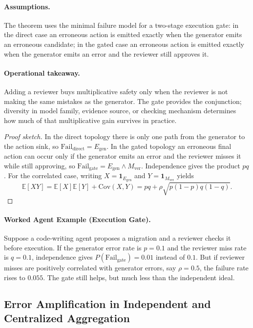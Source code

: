 \paragraph{Assumptions.}
The theorem uses the minimal failure model for a two-stage execution gate: in the direct case an
erroneous action is emitted exactly when the generator emits an erroneous candidate; in the gated case an
erroneous action is emitted exactly when the generator emits an error and the reviewer still approves it.

\paragraph{Operational takeaway.}
Adding a reviewer buys multiplicative safety only when the reviewer is not making the same mistakes as
the generator. The gate provides the conjunction; diversity in model family, evidence source, or checking
mechanism determines how much of that multiplicative gain survives in practice.

\begin{proof}[Proof sketch]
In the direct topology there is only one path from the generator to the action sink, so
$\mathrm{Fail}_{\mathrm{direct}} = E_{\mathrm{gen}}$. In the gated topology an erroneous final action can
occur only if the generator emits an error and the reviewer misses it while still approving, so
$\mathrm{Fail}_{\mathrm{gate}} = E_{\mathrm{gen}} \wedge M_{\mathrm{ver}}$. Independence gives the product
$pq$. For the correlated case, writing $X = \mathbf{1}_{E_{\mathrm{gen}}}$ and
$Y = \mathbf{1}_{M_{\mathrm{ver}}}$ yields
\[
\mathbb{E}[XY] = \mathbb{E}[X]\mathbb{E}[Y] + \mathrm{Cov}(X,Y)
= pq + \rho\sqrt{p(1-p)q(1-q)}.
\]
\end{proof}

\paragraph{Worked Agent Example (Execution Gate).}
Suppose a code-writing agent proposes a migration and a reviewer checks it before execution. If the
generator error rate is $p=0.1$ and the reviewer miss rate is $q=0.1$, independence gives
$P(\mathrm{Fail}_{\mathrm{gate}})=0.01$ instead of $0.1$. But if reviewer misses are positively correlated
with generator errors, say $\rho=0.5$, the failure rate rises to $0.055$. The gate still helps, but much
less than the independent ideal.

\subsection{Error Amplification in Independent and Centralized Aggregation}

